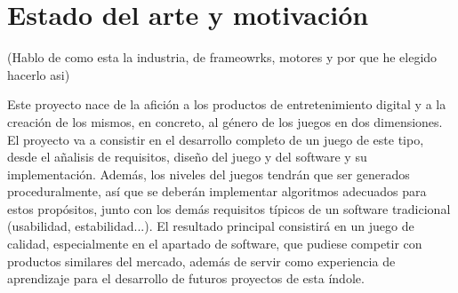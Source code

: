 \section{Estado del arte y motivación}

(Hablo de como esta la industria, de frameowrks, motores y por que he elegido hacerlo asi)

Este proyecto nace de la afición a los productos de entretenimiento digital y a la creación de los mismos, en concreto, al género de los juegos en dos dimensiones. El proyecto va a consistir en el desarrollo completo de un juego de este tipo, desde el añalisis de requisitos, diseño del juego y del software y su implementación. Además, los niveles del juegos tendrán que ser generados proceduralmente, así que se deberán implementar algoritmos adecuados para estos propósitos, junto con los demás requisitos típicos de un software tradicional (usabilidad, estabilidad...). El resultado principal consistirá en un juego de calidad, especialmente en el apartado de software, que pudiese competir con productos similares del mercado, además de servir como experiencia de aprendizaje para el desarrollo de futuros proyectos de esta índole.